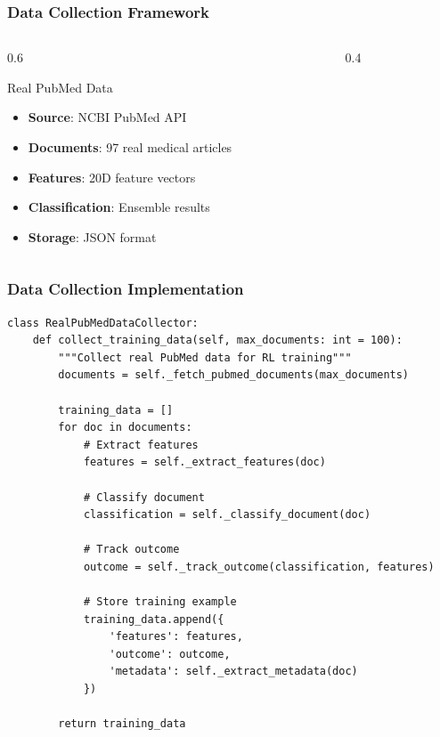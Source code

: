 \documentclass{beamer}
\begin{document}
\begin{frame}
\frametitle{Data Collection Framework}
\begin{columns}
\begin{column}{0.6\textwidth}
\begin{block}{Real PubMed Data}
\begin{itemize}
\item \textbf{Source}: NCBI PubMed API
\item \textbf{Documents}: 97 real medical articles
\item \textbf{Features}: 20D feature vectors
\item \textbf{Classification}: Ensemble results
\item \textbf{Storage}: JSON format
\end{itemize}
\end{block}
\end{column}
\begin{column}{0.4\textwidth}
\begin{center}
\end{center}
\end{column}
\end{columns}
\end{frame}

\begin{frame}[fragile]
\frametitle{Data Collection Implementation}
\begin{lstlisting}
class RealPubMedDataCollector:
    def collect_training_data(self, max_documents: int = 100):
        """Collect real PubMed data for RL training"""
        documents = self._fetch_pubmed_documents(max_documents)
        
        training_data = []
        for doc in documents:
            # Extract features
            features = self._extract_features(doc)
            
            # Classify document
            classification = self._classify_document(doc)
            
            # Track outcome
            outcome = self._track_outcome(classification, features)
            
            # Store training example
            training_data.append({
                'features': features,
                'outcome': outcome,
                'metadata': self._extract_metadata(doc)
            })
        
        return training_data
\end{lstlisting}
\end{frame}
\end{document}
